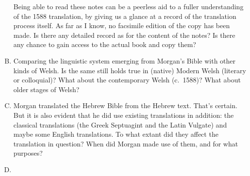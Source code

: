 \begin{enumerate}[A.]
		Being able to read these notes can be a peerless aid to a fuller understanding of the 1588 translation, by giving us a glance at a record of the translation process itself. As far as I know, no facsimile edition of the copy has been made. Is there any detailed record as for the content of the notes? Is there any chance to gain access to the actual book and copy them?

	\item Comparing the linguistic system emerging from Morgan’s Bible with other kinds of Welsh. Is the same still holds true in (native) Modern Welsh (literary or colloquial)? What about the contemporary Welsh (c.~1588)? What about older stages of Welsh?

	\item Morgan translated the Hebrew Bible from the Hebrew text. That’s certain. But it is also evident that he did use existing translations in addition: the classical translations (the Greek Septuagint and the Latin Vulgate) and maybe some English translations. To what extant did they affect the translation in question? When did Morgan made use of them, and for what purposes?

	\item {}
\end{enumerate}
